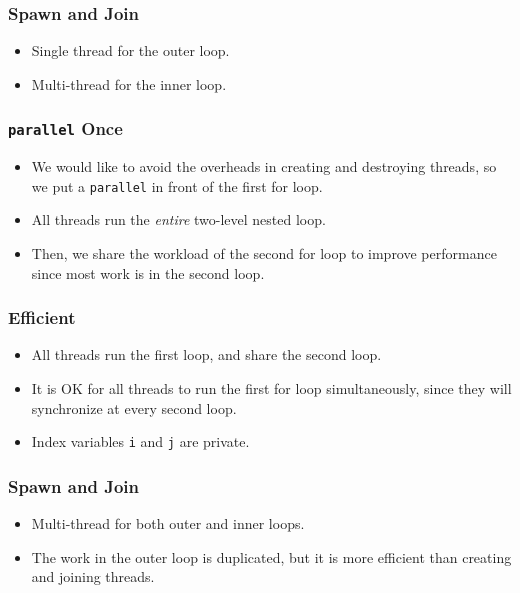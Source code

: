 \documentclass{beamer}
\begin{document}
\begin{frame}
\frametitle{Spawn and Join}
\centerline{}
\begin{itemize}
\item Single thread for the outer loop.
\item Multi-thread for the inner loop.
\end{itemize}
\end{frame}

\begin{frame}
\frametitle{{\tt parallel} Once}
\begin{itemize}
\item We would like to avoid the overheads in creating and destroying threads, so we put a {\tt parallel} in front of the first for loop.
\item All threads run the {\em entire} two-level nested loop.
\item Then, we share the workload of the second for loop to improve performance since most work is in the second loop.
\end{itemize}
\end{frame}

\begin{frame}
\end{frame}

\begin{frame}
\frametitle{Efficient}
\begin{itemize}
\item All threads run the first loop, and share the second loop.
\item It is OK for all threads to run the first for loop
  simultaneously, since they will synchronize at every second loop.
\item Index variables {\tt i} and {\tt j} are private.
\end{itemize}
\end{frame}

\begin{frame}
\frametitle{Spawn and Join}
\centerline{}
\begin{itemize}
\item Multi-thread for both outer and inner loops.
\item The work in the outer loop is duplicated, but it is more
  efficient than creating and joining threads.
\end{itemize}
\end{frame}
\end{document}
